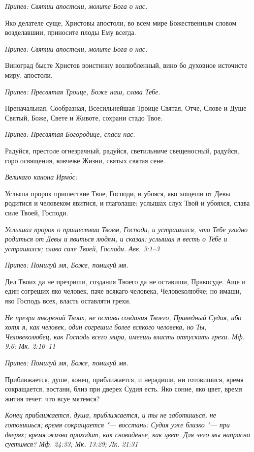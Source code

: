 \itshape Припев:\normalfont{} Святии апостоли, молите Бога о нас.


Яко делателе суще, Христовы апостоли, во всем мире Божественным словом возделавшии, приносите плоды Ему всегда.


\itshape Припев:\normalfont{} Святии апостоли, молите Бога о нас.


Виноград бысте Христов воистинну возлюбленный, вино бо духовное источисте миру, апостоли.


\itshape Припев:\normalfont{} Пресвятая Троице, Боже наш, слава Тебе.


Преначальная, Сообразная, Всесильнейшая Троице Святая, Отче, Слове и Душе Святый, Боже, Свете и Животе, сохрани стадо Твое.


\itshape Припев:\normalfont{} Пресвятая Богородице, спаси нас.


Радуйся, престоле огнезрачный, радуйся, светильниче свещеносный, радуйся, горо освящения, ковчеже Жизни, святых святая сене.


\itshape Великаго канона Ирмо́с:\normalfont{}


Услыша пророк пришествие Твое, Господи, и убояся, яко хощеши от Девы родитися и человеком явитися, и глаголаше: услышах слух Твой и убояхся, слава силе Твоей, Господи.


\itshape Услышал пророк о пришествии Твоем, Господи, и устрашился, что Тебе угодно родиться от Девы и явиться людям, и сказал: услышал я весть о Тебе и устрашился; слава силе Твоей, Господи. Авв. 3:1–3\normalfont{}


\itshape Припев:\normalfont{} Помилуй мя, Боже, помилуй мя.


Дел Твоих да не презриши, создания Твоего да не оставиши, Правосуде. Аще и един согреших яко человек, паче всякаго человека, Человеколюбче; но имаши, яко Господь всех, власть оставляти грехи.


\itshape Не презри творений Твоих, не оставь создания Твоего, Праведный Судия, ибо хотя я, как человек, один согрешил более всякого человека, но Ты, Человеколюбец, как Господь всего мира, имеешь власть отпускать грехи. Мф. 9:6; Мк. 2:10–11\normalfont{}


\itshape Припев:\normalfont{} Помилуй мя, Боже, помилуй мя.


Приближается, душе, конец, приближается, и нерадиши, ни готовишися, время сокращается, востани, близ при дверех Судия есть. Яко соние, яко цвет, время жития течет: что всуе мятемся?


\itshape Конец приближается, душа, приближается, и ты не заботишься, не готовишься; время сокращается "--- восстань: Судия уже близко "--- при дверях; время жизни проходит, как сновиденье, как цвет. Для чего мы напрасно суетимся? Мф. 24:33; Мк. 13:29; Лк. 21:31\normalfont{}



